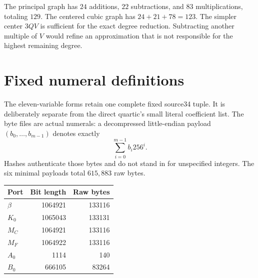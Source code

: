 \documentclass[11pt]{article}
\theoremstyle{definition}
\theoremstyle{remark}
\begin{document}
The principal graph has $24$ additions, $22$ subtractions, and $83$
multiplications, totaling $129$. The centered cubic graph has
$24+21+78=123$. The simpler center $3QV$ is sufficient for the exact
degree reduction. Subtracting another multiple of $V$ would refine an
approximation that is not responsible for the highest remaining degree.



\section{Fixed numeral definitions}
\label{sec:constants}

The eleven-variable forms retain one complete fixed source34 tuple.
It is deliberately separate from the direct quartic's small literal
coefficient list. The byte files are actual numerals: a decompressed
little-endian payload $(b_0,\ldots,b_{m-1})$ denotes exactly
\[
 \sum_{i=0}^{m-1} b_i256^i.
\]
Hashes authenticate those bytes and do not stand in for unspecified
integers. The six minimal payloads total $615{,}883$ raw bytes.

\begin{center}
\begin{tabular}{lrr}
\toprule
Port & Bit length & Raw bytes\\
\midrule
$\beta$ & 1064921 & 133116\\
$K_0$ & 1065043 & 133131\\
$M_C$ & 1064921 & 133116\\
$M_F$ & 1064922 & 133116\\
$A_0$ & 1114 & 140\\
$B_0$ & 666105 & 83264\\
\bottomrule
\end{tabular}
\end{center}
\end{document}

